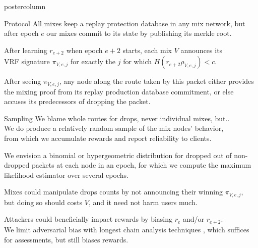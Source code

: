 \documentclass{beamer}
\begin{document}
\begin{frame}
\begin{columns}
\begin{column}{.49\textwidth}
\begin{beamercolorbox}[center,wd=\textwidth]{postercolumn}
\begin{minipage}[T]{.95\textwidth}
{\begin{block}{Protocol}
                All mixes keep a replay protection database in any mix network, but \\
                after epoch $e$ our mixes commit to its state by publishing its merkle root. \\ \bigskip \bigskip

                After learning $r_{e+2}$ when epoch $e+2$ starts, each mix $V$ announces its \\
                VRF signature $\pi_{V,e,j}$ for exactly the $j$ for which $H(r_{e+2} \rho_{V,e,j}) < c$. \\ \bigskip \bigskip

                After seeing $\pi_{V,e,j}$, any node along the route taken by this packet either provides the mixing proof from its replay production database commitment, or else accuses its predecessors of dropping the packet.  \\ \bigskip
            \end{block}
            \vfill
            \begin{block}{Sampling}
                We blame whole routes for drops, never individual mixes, but.. \\ \bigskip
                We do produce a relatively random sample of the mix nodes' behavior, \\
                from which we accumulate rewards and report reliability to clients. \\ \bigskip \bigskip

                We envision a binomial or hypergeometric distribution for
                dropped out of non-dropped packets at each node in an epoch, for which
                we compute the maximum likelihood estimator over several epochs. \\ \bigskip \bigskip

                Mixes could manipulate drops counts by not announcing their winning $\pi_{V,e,j}$, \\
                but doing so should costs $V$, and it need not harm users much. \\ \bigskip \bigskip

                Attackers could beneficially impact rewards by biasing $r_e$ and/or $r_{e+2}$. \\ \bigskip
                We limit adversarial bias with longest chain analysis techniques \cite{OuroborosPraos} ,
                which suffices for assessments, but still biases rewards. \\ \bigskip \bigskip


\end{block}}
\end{minipage}
\end{beamercolorbox}
\end{column}
\end{columns}
\end{frame}
\end{document}
